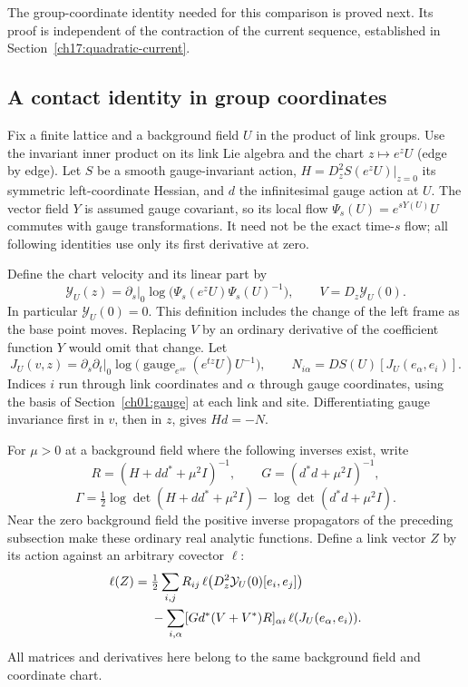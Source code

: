 The group-coordinate identity needed for this comparison is proved next.
Its proof is independent of the contraction of the current
sequence, established in Section~\ref{ch17:quadratic-current}.

\subsection{A contact identity in group coordinates}
\label{ch17:contact-section}

Fix a finite lattice and a background field $U$ in the product of link groups.
Use the invariant inner product on its link Lie algebra and the chart
$z\mapsto e^zU$ (edge by edge). Let $S$ be a smooth gauge-invariant action,
$H=D_z^2S(e^zU)|_{z=0}$ its symmetric left-coordinate Hessian, and
$d$ the infinitesimal gauge action at $U$. The vector field $Y$ is assumed
gauge covariant, so its local flow
$\Psi_s(U)=e^{sY(U)}U$ commutes with gauge transformations. It need not
be the exact time-$s$ flow; all following identities use only its
first derivative at zero.

Define the chart velocity and its linear part by
\[
 \mathcal Y_U(z)=\left.\partial_s\right|_0
    \log\bigl(\Psi_s(e^zU)\Psi_s(U)^{-1}\bigr),
 \qquad V=D_z\mathcal Y_U(0).
\]
In particular $\mathcal Y_U(0)=0$. This definition includes the
change of the left frame as the base point moves. Replacing $V$ by an
ordinary derivative of the coefficient function $Y$ would omit that
change. Let
\[
 J_U(v,z)=\left.\partial_s\partial_t\right|_{0}
       \log\bigl(\operatorname{gauge}_{e^{sv}}(e^{tz}U)U^{-1}\bigr),
 \qquad N_{i\alpha}=DS(U)[J_U(e_\alpha,e_i)].
\]
Indices $i$ run through link coordinates and $\alpha$ through gauge
coordinates, using the basis of Section~\ref{ch01:gauge} at each link and site. Differentiating gauge invariance first in $v$, then in $z$,
gives $Hd=-N$.

For $\mu>0$ at a background field where the following inverses exist, write
\[
 R=(H+dd^*+\mu^2I)^{-1},\qquad
 G=(d^*d+\mu^2I)^{-1},
\]
\[
 \Gamma=\tfrac12\log\det(H+dd^*+\mu^2I)
                            -\log\det(d^*d+\mu^2I).
\]
Near the zero background field the positive inverse propagators of the preceding
subsection make these ordinary real analytic functions. Define a link
vector $Z$ by its action against an arbitrary covector $\ell$:
\begin{align}
 \ell(Z)={}&\tfrac12\sum_{i,j}R_{ij}\,
                   \ell\bigl(D_z^2\mathcal Y_U(0)[e_i,e_j]\bigr)\notag\\
 &-\sum_{i,\alpha}
       [Gd^*(V+V^*)R]_{\alpha i}\,\ell(J_U(e_\alpha,e_i)).
 \label{ch17:contact-Z}
\end{align}
All matrices and derivatives here belong to the same background field and
coordinate chart.

